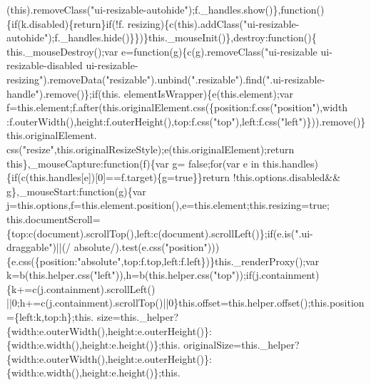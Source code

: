 \begin{DoxyCode}
      (\textcolor{keyword}{this}).removeClass(\textcolor{stringliteral}{"ui-resizable-autohide"});f.\_handles.show()\},\textcolor{keyword}{function}()\{\textcolor{keywordflow}{if}(k.disabled)\{\textcolor{keywordflow}{return}\}\textcolor{keywordflow}{if}(!f.
      resizing)\{c(\textcolor{keyword}{this}).addClass(\textcolor{stringliteral}{"ui-resizable-autohide"});f.\_handles.hide()\}\})\}this.\_mouseInit()\},destroy:\textcolor{keyword}{function}()\{
      this.\_mouseDestroy();var e=\textcolor{keyword}{function}(g)\{c(g).removeClass(\textcolor{stringliteral}{"ui-resizable ui-resizable-disabled
       ui-resizable-resizing"}).removeData(\textcolor{stringliteral}{"resizable"}).unbind(\textcolor{stringliteral}{".resizable"}).find(\textcolor{stringliteral}{".ui-resizable-handle"}).remove()\};\textcolor{keywordflow}{if}(this.
      elementIsWrapper)\{e(this.element);var f=this.element;f.after(this.originalElement.css(\{position:f.css(\textcolor{stringliteral}{"position"}),width
      :f.outerWidth(),height:f.outerHeight(),top:f.css(\textcolor{stringliteral}{"top"}),left:f.css(\textcolor{stringliteral}{"left"})\})).\textcolor{keyword}{remove}()\}this.originalElement.
      css(\textcolor{stringliteral}{"resize"},this.originalResizeStyle);e(this.originalElement);\textcolor{keywordflow}{return} \textcolor{keyword}{this}\},\_mouseCapture:\textcolor{keyword}{function}(f)\{var g=\textcolor{keyword}{
      false};\textcolor{keywordflow}{for}(var e in this.handles)\{\textcolor{keywordflow}{if}(c(this.handles[e])[0]==f.target)\{g=\textcolor{keyword}{true}\}\}\textcolor{keywordflow}{return} !this.options.disabled&&
      g\},\_mouseStart:\textcolor{keyword}{function}(g)\{var j=this.options,f=this.element.position(),e=this.element;this.resizing=\textcolor{keyword}{true};
      this.documentScroll=\{top:c(document).scrollTop(),left:c(document).scrollLeft()\};\textcolor{keywordflow}{if}(e.is(\textcolor{stringliteral}{".ui-draggable"})||(/
      absolute/).test(e.css(\textcolor{stringliteral}{"position"})))\{e.css(\{position:\textcolor{stringliteral}{"absolute"},top:f.top,left:f.left\})\}this.\_renderProxy();var
       k=b(this.helper.css(\textcolor{stringliteral}{"left"})),h=b(this.helper.css(\textcolor{stringliteral}{"top"}));\textcolor{keywordflow}{if}(j.containment)\{k+=c(j.containment).scrollLeft()
      ||0;h+=c(j.containment).scrollTop()||0\}this.offset=this.helper.offset();this.position=\{left:k,top:h\};this.
      size=this.\_helper?\{width:e.outerWidth(),height:e.outerHeight()\}:\{width:e.width(),height:e.height()\};this.
      originalSize=this.\_helper?\{width:e.outerWidth(),height:e.outerHeight()\}:\{width:e.width(),height:e.height()\};this.

\end{DoxyCode}
